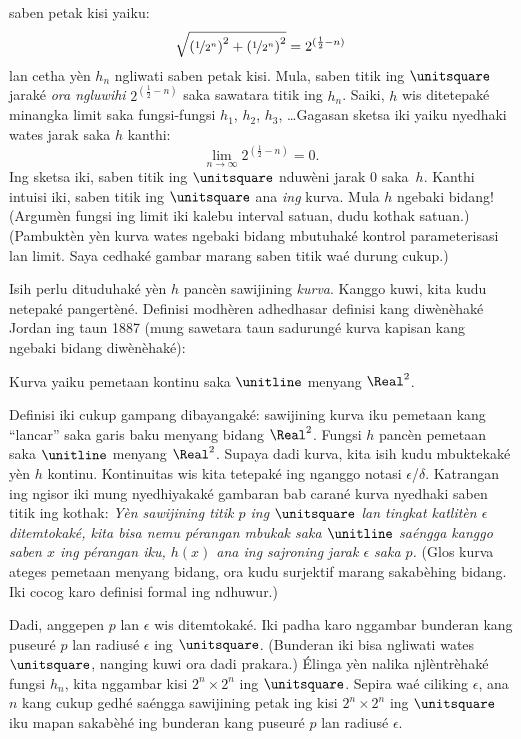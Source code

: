 \documentclass[../../../include/open-logic-section]{subfiles}
\begin{document}
saben petak kisi yaiku:
\[
\sqrt{\left(\nicefrac{1}{2^{n}}\right)^2+\left(\nicefrac{1}{2^{n}}\right)^2} = 2^{(\frac{1}{2}-n)}
\]
lan cetha yèn $h_n$ ngliwati saben petak kisi. Mula, saben titik
ing $\unitsquare$ jaraké \emph{ora ngluwihi}
$2^{(\frac{1}{2}-n)}$ saka sawatara titik ing $h_n$. Saiki, $h$ wis
ditetepaké minangka limit saka fungsi-fungsi $h_1$, $h_2$,
$h_3$, \dots\@ Gagasan sketsa iki yaiku nyedhaki wates jarak saka $h$ kanthi:
\[
\lim_{n \rightarrow \infty} 2^{(\frac{1}{2}-n)} = 0.
\]
Ing sketsa iki, saben titik ing $\unitsquare$ nduwèni jarak
$0$ saka~$h$. Kanthi intuisi iki, saben titik ing $\unitsquare$
ana \emph{ing} kurva. Mula $h$ ngebaki bidang!{}
(Argumèn fungsi ing limit iki kalebu interval satuan, dudu kothak satuan.)
(Pambuktèn yèn kurva wates ngebaki bidang mbutuhaké kontrol parameterisasi lan limit. Saya cedhaké gambar marang saben titik waé durung cukup.)

Isih perlu dituduhaké yèn $h$ pancèn sawijining \emph{kurva}.
Kanggo kuwi, kita kudu netepaké pangertèné. Definisi modhèren
adhedhasar definisi kang diwènèhaké Jordan ing taun 1887
(mung sawetara taun sadurungé kurva kapisan kang ngebaki bidang
diwènèhaké):

\begin{defn}
Kurva yaiku pemetaan kontinu saka $\unitline$ menyang $\Real^2$.
\end{defn}

Definisi iki cukup gampang dibayangaké: sawijining kurva iku
pemetaan kang ``lancar'' saka garis baku menyang bidang $\Real^2$.
Fungsi $h$ pancèn pemetaan saka $\unitline$ menyang $\Real^2$.
Supaya dadi kurva, kita isih kudu mbuktekaké yèn $h$ kontinu.
Kontinuitas wis kita tetepaké ing  nganggo
notasi $\epsilon$/$\delta$. Katrangan ing ngisor iki mung
nyedhiyakaké gambaran bab carané kurva nyedhaki saben titik ing
kothak: \emph{Yèn sawijining titik $p$ ing $\unitsquare$ lan
tingkat katlitèn $\epsilon$ ditemtokaké, kita bisa nemu pérangan
mbukak saka $\unitline$ saéngga kanggo saben $x$ ing pérangan
iku, $h(x)$ ana ing sajroning jarak $\epsilon$ saka $p$.}
(Glos kurva ateges pemetaan menyang bidang, ora kudu surjektif marang sakabèhing bidang. Iki cocog karo definisi formal ing ndhuwur.)

Dadi, anggepen $p$ lan $\epsilon$ wis ditemtokaké. Iki padha
karo nggambar bunderan kang puseuré $p$ lan radiusé $\epsilon$
ing $\unitsquare$. (Bunderan iki bisa ngliwati wates
$\unitsquare$, nanging kuwi ora dadi prakara.) Élinga yèn nalika
njlèntrèhaké fungsi $h_n$, kita nggambar kisi $2^n \times 2^n$
ing $\unitsquare$. Sepira waé ciliking $\epsilon$, ana $n$
kang cukup gedhé saéngga sawijining petak ing kisi
$2^n \times 2^n$ ing $\unitsquare$ iku mapan sakabèhé ing bunderan kang puseuré
$p$ lan radiusé $\epsilon$.
\end{document}
